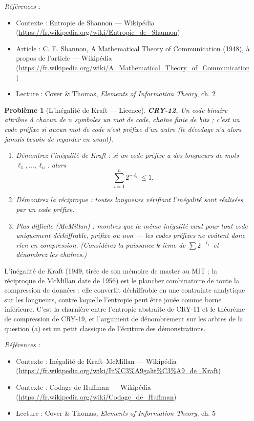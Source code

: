 \documentclass[11pt]{article}
\newtheorem{problem}{Problème}
\newenvironment{refs}{\par\small\noindent\emph{Références :}\begin{itemize}\setlength\itemsep{0pt}}{\end{itemize}\normalsize}
\begin{document}
\begin{refs}
\item Contexte : Entropie de Shannon --- Wikipédia (\url{https://fr.wikipedia.org/wiki/Entropie_de_Shannon})
\item Article : C. E. Shannon, \og{} A Mathematical Theory of Communication \fg{} (1948), à propos de l'article --- Wikipédia (\url{https://fr.wikipedia.org/wiki/A_Mathematical_Theory_of_Communication})
\item Lecture : Cover \& Thomas, \textit{Elements of Information Theory}, ch. 2
\end{refs}

\bigskip

\begin{problem}[{L'inégalité de Kraft --- Licence}]
\textbf{CRY-12.} Un code binaire attribue à chacun de $n$ symboles
un mot de code, chaîne finie de bits ; c'est un \textit{code préfixe} si aucun mot de code
n'est préfixe d'un autre (le décodage n'a alors jamais besoin de regarder en avant).
\begin{enumerate}
\item[(a)] Démontrez l'inégalité de Kraft :
si un code préfixe a des longueurs de mots $\ell_1, \dots, \ell_n$, alors
\[ \sum_{i=1}^{n} 2^{-\ell_i} \le 1. \]
\item[(b)] Démontrez la réciproque : toutes longueurs vérifiant l'inégalité sont réalisées par un
code préfixe.
\item[(c)] Plus difficile (McMillan) : montrez que la même inégalité vaut pour tout
code uniquement déchiffrable, préfixe ou non --- les codes préfixes ne coûtent donc rien en
compression. (Considérez la puissance $k$-ième de $\sum 2^{-\ell_i}$ et dénombrez les
chaînes.)
\end{enumerate}

\end{problem}

\noindent L'inégalité de Kraft (1949, tirée de son mémoire de master au MIT ; la
réciproque de McMillan date de 1956) est le plancher combinatoire de toute la compression de
données : elle convertit \og{} déchiffrable \fg{} en une contrainte analytique sur les longueurs,
contre laquelle l'entropie peut être jouée comme borne inférieure. C'est la charnière entre
l'entropie abstraite de CRY-11 et le théorème de compression de CRY-19, et l'argument de
dénombrement sur les arbres de la question (a) est un petit classique de l'écriture des
démonstrations.

\begin{refs}
\item Contexte : Inégalité de Kraft--McMillan --- Wikipédia (\url{https://fr.wikipedia.org/wiki/In%C3%A9galit%C3%A9_de_Kraft})
\item Contexte : Codage de Huffman --- Wikipédia (\url{https://fr.wikipedia.org/wiki/Codage_de_Huffman})
\item Lecture : Cover \& Thomas, \textit{Elements of Information Theory}, ch. 5
\end{refs}
\end{document}
